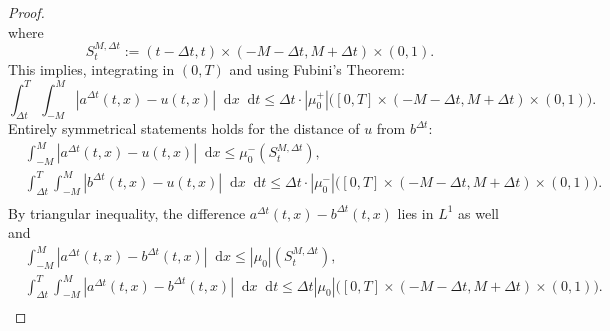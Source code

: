 \documentclass[11pt, twoside, reqno]{amsart}
\theoremstyle{definition}
\theoremstyle{remark}
\numberwithin{equation}{section}
\newcommand*\dif{\mathop{}\!\mathrm{d}}
\begin{document}
\begin{proof}
\begin{equation}
\end{equation}
where 
$$
S_t^{M, \Delta t}:= (t-\Delta t, t) \times (-M- \Delta t, M + \Delta t) \times (0, 1).
$$
This implies, integrating in $(0, T)$ and using Fubini's Theorem:
\begin{equation}\label{eq:uminusa}
    \int_{\Delta t}^T \int_{-M}^M |a^{\Delta t}(t, x) -u(t, x) | \dif x \dif t \leq \Delta t \cdot |\mu_0^+|\big([0,T] \times (-M-\Delta t, M+\Delta t) \times (0, 1) \big).
\end{equation}
Entirely symmetrical statements holds for the distance of $u$ from $b^{\Delta t}$:
\begin{equation}\label{eq:uminusb}
\begin{aligned}
    &  \int_{-M}^M |a^{\Delta t}(t, x) -u(t, x) | \dif x \leq \mu_0^-(S_t^{M, \Delta t}),\\
    & \int_{\Delta t}^T \int_{-M}^M |b^{\Delta t}(t, x) -u(t, x) | \dif x \dif t \leq \Delta t \cdot |\mu_0^-|\big([0,T] \times (-M-\Delta t, M+\Delta t) \times (0, 1) \big).\\
    \end{aligned}
\end{equation}
By triangular inequality, the difference $a^{\Delta t}(t, x)-b^{\Delta t}(t, x)$ lies in $L^1$ as well and 
\begin{equation}\label{eq:abdifference}
\begin{aligned}
& \int_{-M}^M |a^{\Delta t}(t, x)-b^{\Delta t}(t, x)| \dif x  \leq  |\mu_0|(S_t^{M, \Delta t}),\\
    & \int_{\Delta t}^T \int_{-M}^M |a^{\Delta t}(t, x)-b^{\Delta t}(t, x)| \dif x \dif t \leq \Delta t |\mu_0|\big([0,T] \times (-M-\Delta t, M+\Delta t) \times (0, 1) \big).\\
    \end{aligned}
\end{equation}


\end{proof}
\end{document}
